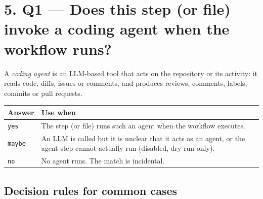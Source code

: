 \documentclass[10pt,a4paper]{article}
\newcommand{\val}[1]{\texttt{#1}}
\begin{document}
\section*{5. Q1 --- Does this step (or file) invoke a coding agent when the workflow runs?}

A \emph{coding agent} is an LLM-based tool that acts on the repository or its
activity: it reads code, diffs, issues or comments, and produces reviews,
comments, labels, commits or pull requests.

\begin{tabularx}{\linewidth}{@{}l L@{}}
\toprule
\textbf{Answer} & \textbf{Use when} \\
\midrule
\val{yes} & The step (or file) runs such an agent when the workflow executes. \\
\val{maybe} & An LLM is called but it is unclear that it acts as an agent, or the agent step cannot actually run (disabled, dry-run only). \\
\val{no} & No agent runs. The match is incidental. \\
\bottomrule
\end{tabularx}

\subsection*{Decision rules for common cases}
\end{document}
